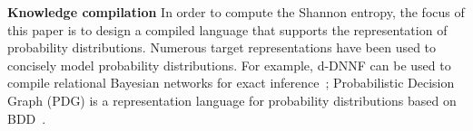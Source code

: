 \textbf{Knowledge compilation} 
In order to compute the Shannon entropy, the focus of this paper is to design a compiled language that supports the representation of probability distributions.
Numerous target representations have been used to concisely model probability distributions. %
For example, d-DNNF can be used to compile relational Bayesian networks for exact inference~\cite{chavira2006compiling};
Probabilistic Decision Graph (PDG) is a representation language for probability distributions based on BDD~\cite{jaeger2004probabilistic}.
